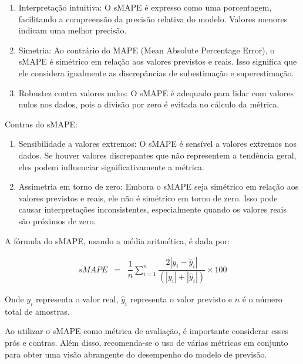 \begin{enumerate}
	\item Interpretação intuitiva: O sMAPE é expresso como uma porcentagem, facilitando a compreensão da precisão relativa do modelo. Valores menores indicam uma melhor precisão.
	
	\item Simetria: Ao contrário do MAPE (Mean Absolute Percentage Error), o sMAPE é simétrico em relação aos valores previstos e reais. Isso significa que ele considera igualmente as discrepâncias de subestimação e superestimação.
	
	\item Robustez contra valores nulos: O sMAPE é adequado para lidar com valores nulos nos dados, pois a divisão por zero é evitada no cálculo da métrica.
\end{enumerate}

Contras do sMAPE:

\begin{enumerate}
	\item Sensibilidade a valores extremos: O sMAPE é sensível a valores extremos nos dados. Se houver valores discrepantes que não representem a tendência geral, eles podem influenciar significativamente a métrica.
	
	\item Assimetria em torno de zero: Embora o sMAPE seja simétrico em relação aos valores previstos e reais, ele não é simétrico em torno de zero. Isso pode causar interpretações inconsistentes, especialmente quando os valores reais são próximos de zero.
\end{enumerate}

A fórmula do sMAPE, usando a média aritmética, é dada por:


\begin{eqnarray}
	sMAPE &=& \dfrac{1}{n} \sum_{i=1}^{n} \dfrac{2|y_i - \hat{y}_i|}{(|y_i| + |\hat{y}_i|)} \times 100\label{eq:smape}
\end{eqnarray}


Onde $y_i$ representa o valor real, $\hat{y}_i$ representa o valor previsto e $n$ é o número total de amostras.

Ao utilizar o sMAPE como métrica de avaliação, é importante considerar esses prós e contras. Além disso, recomenda-se o uso de várias métricas em conjunto para obter uma visão abrangente do desempenho do modelo de previsão.